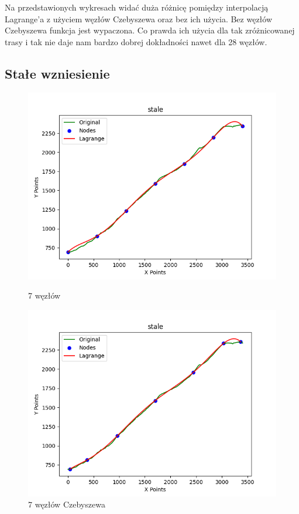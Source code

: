 \documentclass{article}
\begin{document}
Na przedstawionych wykresach widać duża różnicę pomiędzy interpolacją Lagrange'a z użyciem węzłów Czebyszewa oraz bez ich użycia. Bez węzłów Czebyszewa funkcja jest wypaczona. Co prawda ich użycia dla tak zróżnicowanej trasy i tak nie daje nam bardzo dobrej dokładności nawet dla 28 węzłów.

\subsection{Stałe wzniesienie}

\begin{figure}[H]
    \centering
    \begin{minipage}[b]{0.49\textwidth}
        \centering
        \includegraphics[width=\textwidth]{plots/stale_lagrange_7_False.png}
        \caption{7 węzłów}
        \label{fig:7nodes}
    \end{minipage}
    \hfill
    \begin{minipage}[b]{0.49\textwidth}
        \centering
        \includegraphics[width=\textwidth]{plots/stale_lagrange_7_True.png}
        \caption{7 węzłów Czebyszewa}
        \label{fig:7nodes}
    \end{minipage}
\end{figure}
\end{document}
